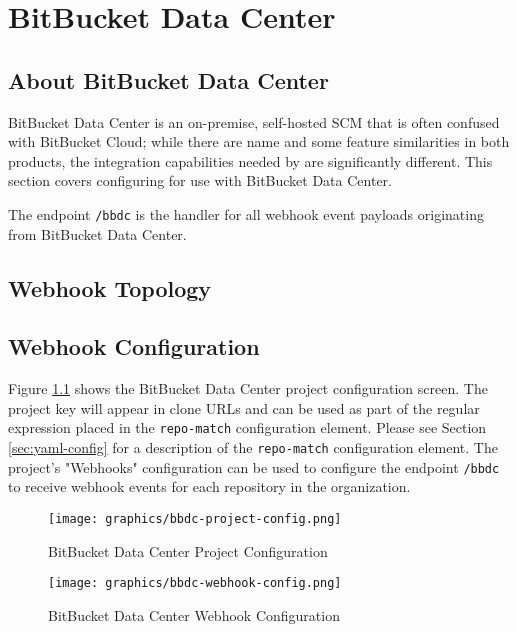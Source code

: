 \chapter{BitBucket Data Center}

\section{About BitBucket Data Center}

BitBucket Data Center is an on-premise, self-hosted SCM that is often confused with BitBucket Cloud; while there are name and some
feature similarities in both products, the integration capabilities needed by \cxoneflow
are significantly different.  This section covers configuring \cxoneflow for use with BitBucket Data Center.

The \cxoneflow endpoint \texttt{/bbdc} is the handler for all webhook event
payloads originating from BitBucket Data Center.  

\section{Webhook Topology}



\section{Webhook Configuration}

Figure \ref{fig:bbdc-project-config} shows the BitBucket Data Center project configuration screen.  The
project key will appear in clone URLs and can be used as part of the regular expression 
placed in the \texttt{repo-match} configuration element.  Please see Section \ref{sec:yaml-config} 
for a description of the \texttt{repo-match} configuration element. The project's "Webhooks" configuration
can be used to configure the \cxoneflow endpoint \texttt{/bbdc} to receive webhook events for each repository in the organization.  

\begin{figure}[ht]
    \texttt{[image: graphics/bbdc-project-config.png]}
    \caption{BitBucket Data Center Project Configuration}
    \label{fig:bbdc-project-config}
\end{figure}

\begin{figure}[ht]
    \texttt{[image: graphics/bbdc-webhook-config.png]}
    \caption{BitBucket Data Center Webhook Configuration}
    \label{fig:bbdc-webhook-config}
\end{figure}


